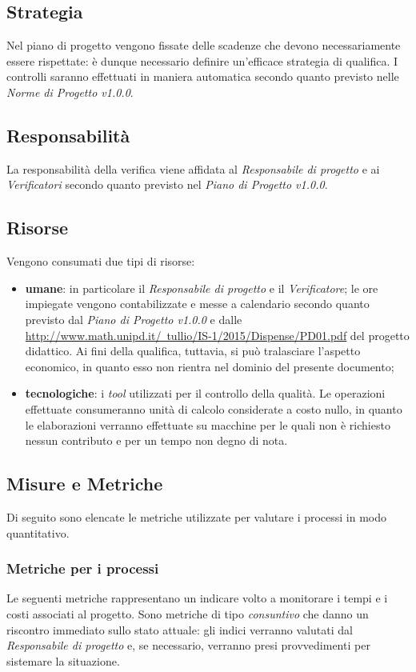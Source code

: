 \subsection{Strategia}
Nel piano di progetto vengono fissate delle scadenze che devono necessariamente essere rispettate: \`e dunque necessario definire un'efficace strategia di qualifica. I controlli saranno effettuati in maniera automatica secondo quanto previsto nelle \textit{Norme di Progetto v1.0.0}. 

\subsection{Responsabilit\`a}
La responsabilit\`a della verifica viene affidata al \textit{Responsabile di progetto} e ai \textit{Verificatori} secondo quanto previsto nel \textit{Piano di Progetto v1.0.0}.

\subsection{Risorse}
Vengono consumati due tipi di risorse:
\begin{itemize}
	\item \textbf{umane}: in particolare il \textit{Responsabile di progetto} e il \textit{Verificatore}; le ore impiegate vengono contabilizzate e messe a calendario secondo quanto previsto dal \textit{Piano di Progetto v1.0.0} e dalle \href{regole}{http://www.math.unipd.it/~tullio/IS-1/2015/Dispense/PD01.pdf} del progetto didattico. Ai fini della qualifica, tuttavia, si pu\`o tralasciare l'aspetto economico, in quanto esso non rientra nel dominio del presente documento;
		\item \textbf{tecnologiche}: i \textit{tool} utilizzati per il controllo della qualit\`a. Le operazioni effettuate  consumeranno unit\`a di calcolo considerate a costo nullo, in quanto le elaborazioni verranno effettuate su macchine per le quali non \`e richiesto nessun contributo e per un tempo non degno di nota.
\end{itemize}

\subsection{Misure e Metriche}
Di seguito sono elencate le metriche utilizzate per valutare i processi in modo quantitativo.
\subsubsection{Metriche per i processi}
Le seguenti metriche rappresentano un indicare volto a monitorare i tempi e i costi associati al progetto. Sono metriche di tipo \textit{consuntivo} che danno un riscontro immediato sullo stato attuale: gli indici verranno valutati dal \textit{Responsabile di progetto} e, se necessario, verranno presi provvedimenti per sistemare la situazione. 

